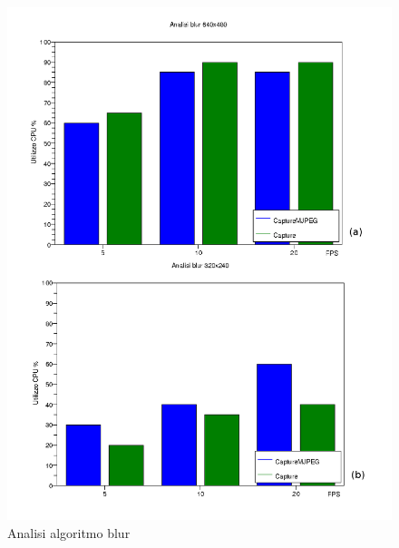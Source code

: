 \documentclass[a4paper,11pt]{article}
\begin{document}
\begin{figure}
  \centering
  \includegraphics[scale=2.0]{img/istogrammi.png}
  \caption{Analisi algoritmo blur}
  \label{fig:blur_isto}
\end{figure}
\end{document}
